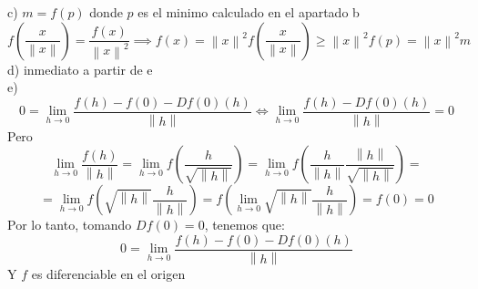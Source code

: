 \documentclass{article}
\newcommand\norm[1]{\left\lVert#1\right\rVert}
\begin{document}
\newpage
c) $ m = f(p)$ donde $p$ es el minimo calculado en el apartado b
\[
f\left( \frac{x}{\norm{x}} \right) = \frac{f(x)}{\norm{x}^2}
\implies f(x) = \norm{x}^2f \left( \frac{x}{\norm{x}} \right) \geq \norm{x}^2f(p) = \norm{x}^2m
\]
d) inmediato a partir de e \\
e)
\[
0 = \lim_{h \to 0} \frac{f(h) - f(0) - Df(0)(h)}{\norm{h}}
\iff
\lim_{h \to 0} \frac{f(h) - Df(0)(h)}{\norm{h}} = 0
\]
Pero
 \[
 \lim_{h \to 0} \frac{f(h)}{\norm{h}} = \lim_{h \to 0} f\left( \frac{h}{\sqrt{\norm{h}}} \right)
 =
 \lim_{h \to 0} f\left( \frac{h}{\norm{h}} \frac{\norm{h}}{\sqrt{\norm{h}}} \right)
 =
 \]
 \[
 =
  \lim_{h \to 0} f\left(\sqrt{\norm{h}} \frac{h}{\norm{h}}  \right)
  =
  f \left( \lim_{h \to 0} \sqrt{\norm{h}} \frac{h}{\norm{h}} \right)
  =
  f(0) = 0
 \]
 Por lo tanto, tomando $Df(0) = 0$, tenemos que:
 \[
 0 = \lim_{h \to 0} \frac{f(h) - f(0) - Df(0)(h)}{\norm{h}}
 \]
 Y $f$ es diferenciable en el origen
 
 \newpage
 
\end{document}
